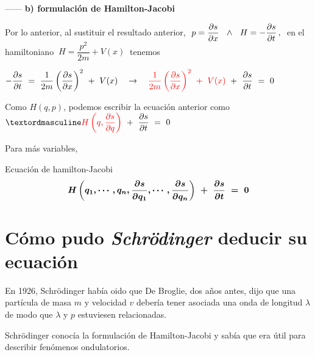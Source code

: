 ------ \textbf{b) formulación de Hamilton-Jacobi}

\begin{adjustwidth}{25pt}{5pt}
Por lo anterior, al sustituir el resultado anterior, $\ \displaystyle p=\pdv{s}{x} \ \  \wedge \ \  	 H=-\pdv{s}{t}\, , \  $ en  el hamiltoniano $\  H=\dfrac{p^2}{2m}+V(x) \ $ tenemos

$\displaystyle -\pdv{s}{t} \ = \ \dfrac 1{2m} \left( \pdv{s}{x} \right)^2 \ + \ V(x) \quad \to \quad \textcolor{red}{\dfrac 1{2m} \left( \pdv{s}{x} \right)^2 \ + \ V(x)} \ + \ \pdv{s}{t}\ = \ 0$

Como $H(q,p)$, podemos escribir la ecuación anterior como $º \displaystyle \textcolor{red}{H\left( q, \pdv{s}{q} \right)} \ + \ \pdv{s}{t} \ = \ 0$

\vspace{5mm} Para más variables, 

\vspace{5mm}

\begin{myalertblock}{Ecuación de hamilton-Jacobi}
\begin{equation}
\boldsymbol{ H\left(q_1,\cdots , q_n, \pdv{s}{q_1}, \cdots , \pdv{s}{q_n} \right) \ + \ \pdv{s}{t} \ = \ 0 }
\end{equation}
\end{myalertblock}

\end{adjustwidth}

\vspace{1cm}
\section{Cómo pudo \emph{Schrödinger} deducir su ecuación}

 
En 1926, Schrödinger había oido que De Broglie, dos años antes, dijo que una partícula de masa $m$ y velocidad $v$ debería tener asociada una onda de longitud $\lambda$ de modo que $\lambda$ y $p$ estuviesen relacionadas.

Schrödinger conocía la formulación de Hamilton-Jacobi y sabía que era útil para describir fenómenos ondulatorios.

